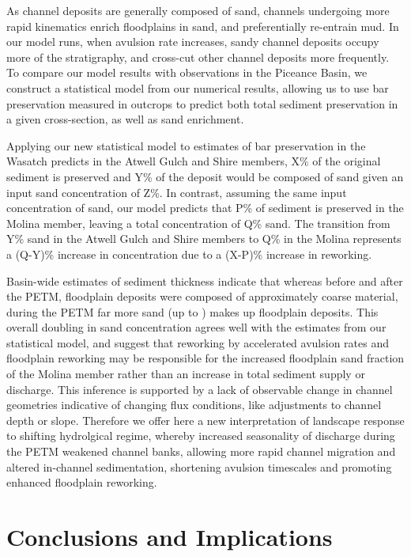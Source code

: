\documentclass[draft]{compact_proposal}\usepackage[]{graphicx}\usepackage[]{color}
\begin{document}
As channel deposits are generally composed of sand, channels undergoing more rapid kinematics enrich floodplains in sand, and preferentially re-entrain mud.
In our model runs, when avulsion rate increases, sandy channel deposits occupy more of the stratigraphy, and cross-cut other channel deposits more frequently. 
To compare our model results with observations in the Piceance Basin, we construct a statistical model from our numerical results, allowing us to use bar preservation measured in outcrops to predict both total sediment preservation in a given cross-section, as well as sand enrichment.

Applying our new statistical model to estimates of bar preservation in the Wasatch predicts in the Atwell Gulch and Shire members, X\% of the original sediment is preserved and Y\% of the deposit would be composed of sand given an input sand concentration of Z\%. 
In contrast, assuming the same input concentration of sand, our model predicts that P\% of sediment is preserved in the Molina member, leaving a total concentration of Q\% sand. 
The transition from Y\% sand in the Atwell Gulch and Shire members to Q\% in the Molina represents a (Q-Y)\% increase in concentration due to a (X-P)\% increase in reworking.

Basin-wide estimates of sediment thickness indicate that whereas before and after the PETM, floodplain deposits were composed of approximately  coarse material, during the PETM far more sand (up to ) makes up floodplain deposits.
This overall doubling in sand concentration agrees well with the estimates from our statistical model, and suggest that reworking by accelerated avulsion rates and floodplain reworking may be responsible for the increased floodplain sand fraction of the Molina member rather than an increase in total sediment supply or discharge.
This inference is supported by a lack of observable change in channel geometries indicative of changing flux conditions, like adjustments to channel depth or slope.
Therefore we offer here a new interpretation of landscape response to shifting hydrolgical regime, whereby increased seasonality of discharge during the PETM weakened channel banks, allowing more rapid channel migration and altered in-channel sedimentation, shortening avulsion timescales and promoting enhanced floodplain reworking.

\section{Conclusions and Implications}
\end{document}
